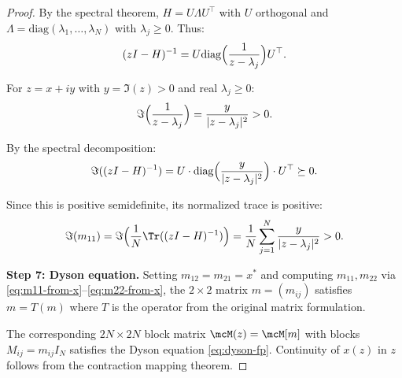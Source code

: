 \begin{proof}
By the spectral theorem, $H = U \Lambda U^\top$ with $U$ orthogonal and $\Lambda = \mathrm{diag}(\lambda_1, \ldots, \lambda_N)$ with $\lambda_j \geq 0$. Thus:
\[
(zI - H)^{-1} = U \mathrm{diag}\Bigl(\frac{1}{z - \lambda_j}\Bigr) U^\top.
\]

For $z = x + iy$ with $y = \Im(z) > 0$ and real $\lambda_j \geq 0$:
\[
\Im\Bigl(\frac{1}{z - \lambda_j}\Bigr) = \frac{y}{|z - \lambda_j|^2} > 0.
\]

By the spectral decomposition:
\[
\Im((zI - H)^{-1}) = U \cdot \mathrm{diag}\Bigl(\frac{y}{|z - \lambda_j|^2}\Bigr) \cdot U^\top \succeq 0.
\]

Since this is positive semidefinite, its normalized trace is positive:
\[
\Im(m_{11}) = \Im\Bigl(\frac{1}{N}\Tr((zI - H)^{-1})\Bigr) = \frac{1}{N}\sum_{j=1}^N \frac{y}{|z - \lambda_j|^2} > 0.
\]

\textbf{Step 7: Dyson equation.}
Setting $m_{12} = m_{21} = x^*$ and computing $m_{11}, m_{22}$ via \eqref{eq:m11-from-x}--\eqref{eq:m22-from-x}, the $2 \times 2$ matrix $m = (m_{ij})$ satisfies $m = T(m)$ where $T$ is the operator from the original matrix formulation.

The corresponding $2N \times 2N$ block matrix $\mcM(z) = \mcM[m]$ with blocks $M_{ij} = m_{ij} I_N$ satisfies the Dyson equation \eqref{eq:dyson-fp}. Continuity of $x(z)$ in $z$ follows from the contraction mapping theorem.
\end{proof}
